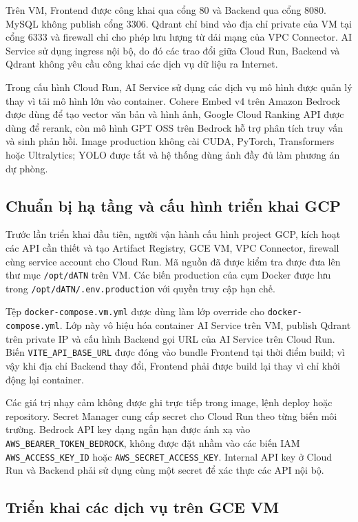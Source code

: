 Trên VM, Frontend được công khai qua cổng 80 và Backend qua cổng 8080. MySQL không publish cổng 3306. Qdrant chỉ bind vào địa chỉ private của VM tại cổng 6333 và firewall chỉ cho phép lưu lượng từ dải mạng của VPC Connector. AI Service sử dụng ingress nội bộ, do đó các trao đổi giữa Cloud Run, Backend và Qdrant không yêu cầu công khai các dịch vụ dữ liệu ra Internet.

Trong cấu hình Cloud Run, AI Service sử dụng các dịch vụ mô hình được quản lý thay vì tải mô hình lớn vào container. Cohere Embed v4 trên Amazon Bedrock được dùng để tạo vector văn bản và hình ảnh, Google Cloud Ranking API được dùng để rerank, còn mô hình GPT OSS trên Bedrock hỗ trợ phân tích truy vấn và sinh phản hồi. Image production không cài CUDA, PyTorch, Transformers hoặc Ultralytics; YOLO được tắt và hệ thống dùng ảnh đầy đủ làm phương án dự phòng.

\subsection{Chuẩn bị hạ tầng và cấu hình triển khai GCP}

Trước lần triển khai đầu tiên, người vận hành cấu hình project GCP, kích hoạt các API cần thiết và tạo Artifact Registry, GCE VM, VPC Connector, firewall cùng service account cho Cloud Run. Mã nguồn đã được kiểm tra được đưa lên thư mục \texttt{/opt/dATN} trên VM. Các biến production của cụm Docker được lưu trong \texttt{/opt/dATN/.env.production} với quyền truy cập hạn chế.

Tệp \texttt{docker-compose.vm.yml} được dùng làm lớp override cho \texttt{docker-compose.yml}. Lớp này vô hiệu hóa container AI Service trên VM, publish Qdrant trên private IP và cấu hình Backend gọi URL của AI Service trên Cloud Run. Biến \texttt{VITE\_API\_BASE\_URL} được đóng vào bundle Frontend tại thời điểm build; vì vậy khi địa chỉ Backend thay đổi, Frontend phải được build lại thay vì chỉ khởi động lại container.

Các giá trị nhạy cảm không được ghi trực tiếp trong image, lệnh deploy hoặc repository. Secret Manager cung cấp secret cho Cloud Run theo từng biến môi trường. Bedrock API key dạng ngắn hạn được ánh xạ vào \texttt{AWS\_BEARER\_TOKEN\_BEDROCK}, không được đặt nhầm vào các biến IAM \texttt{AWS\_ACCESS\_KEY\_ID} hoặc \texttt{AWS\_SECRET\_ACCESS\_KEY}. Internal API key ở Cloud Run và Backend phải sử dụng cùng một secret để xác thực các API nội bộ.

\subsection{Triển khai các dịch vụ trên GCE VM}

